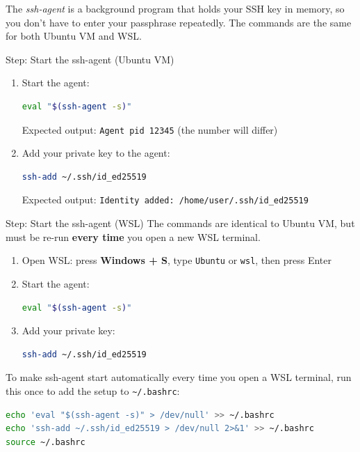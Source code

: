 \documentclass[
    a4paper,
    11pt,
    parskip=half
]{scrartcl}
\begin{document}
The \textit{ssh-agent} is a background program that holds your SSH key in memory, so you don't have to enter your passphrase repeatedly. The commands are the same for both Ubuntu VM and WSL.

\begin{stepbox}{Step: Start the ssh-agent (Ubuntu VM)}
\begin{enumerate}
    \item Start the agent:
\begin{lstlisting}[language=bash]
eval "$(ssh-agent -s)"
\end{lstlisting}
    Expected output: \texttt{Agent pid 12345} (the number will differ)

    \item Add your private key to the agent:
\begin{lstlisting}[language=bash]
ssh-add ~/.ssh/id_ed25519
\end{lstlisting}
    Expected output: \texttt{Identity added: /home/user/.ssh/id\_ed25519}
\end{enumerate}
\end{stepbox}

\begin{stepbox}{Step: Start the ssh-agent (WSL)}
The commands are identical to Ubuntu VM, but must be re-run \textbf{every time} you open a new WSL terminal.
\begin{enumerate}
    \item Open WSL: press \textbf{Windows + S}, type \texttt{Ubuntu} or \texttt{wsl}, then press Enter
    \item Start the agent:
\begin{lstlisting}[language=bash]
eval "$(ssh-agent -s)"
\end{lstlisting}
    \item Add your private key:
\begin{lstlisting}[language=bash]
ssh-add ~/.ssh/id_ed25519
\end{lstlisting}
\end{enumerate}
\end{stepbox}

\begin{tipbox}
To make ssh-agent start automatically every time you open a WSL terminal, run this once to add the setup to \texttt{\textasciitilde/.bashrc}:
\begin{lstlisting}[language=bash]
echo 'eval "$(ssh-agent -s)" > /dev/null' >> ~/.bashrc
echo 'ssh-add ~/.ssh/id_ed25519 > /dev/null 2>&1' >> ~/.bashrc
source ~/.bashrc
\end{lstlisting}
\end{tipbox}
\end{document}
